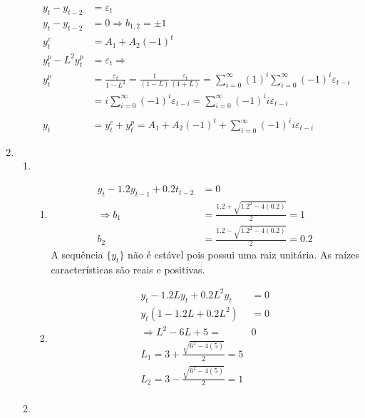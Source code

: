 \begin{enumerate}
\begin{enumerate}
		\begin{align*}
			y_t-y_{t-2}&=\varepsilon_t\\
			y_t-y_{t-2}&=0 \Rightarrow b_{1,2}=\pm1\\
			y_t^c&=A_1+A_2(-1)^t\\
			y_t^p-L^2y_t^p&=\varepsilon_t\Rightarrow\\ y_t^p&=\frac{\varepsilon_t}{1-L^2}=\frac{1}{(1-L)}\frac{\varepsilon_t}{(1+L)}=\sum \limits_{i=0}^{\infty}(1)^i\sum \limits_{i=0}^{\infty}(-1)^i\varepsilon_{t-i}\\
			&=i\sum \limits_{i=0}^{\infty}(-1)^i\varepsilon_{t-i}=\sum \limits_{i=0}^{\infty}(-1)^ii\varepsilon_{t-i}\\
			\\
			y_t&=y_t^c+y_t^p=A_1+A_2(-1)^t+\sum \limits_{i=0}^{\infty}(-1)^ii\varepsilon_{t-i}
		\end{align*}
	
	\end{enumerate}
	
	\item %
	
	\begin{enumerate}
		
		\item %
		\begin{enumerate}
			\item %
		
		\begin{align*}
			y_t-1.2y_{t-1}+0.2t_{t-2}&=0\\
			\Rightarrow b_1&=\frac{1.2+\sqrt{1.2^2-4(0.2)}}{2}=1\\
			b_2&=\frac{1.2-\sqrt{1.2^2-4(0.2)}}{2}=0.2
		\end{align*}		
		A sequência $\{y_t\}$ não é estável pois possui uma raiz unitária. As raízes características são reais e positivas.
		
		\item %
		
		\begin{align*}
			y_t-1.2Ly_t+0.2L^2y_t&=0\\
			y_t(1-1.2L+0.2L^2)&=0\\
			\Rightarrow L^2-6L+5=&0\\
			L_1=3+\frac{\sqrt{6^2-4(5)}}{2}=5\\
			L_2=3-\frac{\sqrt{6^2-4(5)}}{2}=1\\
			\end{align*}
			
	\end{enumerate}
		\item %
		

\end{enumerate}
\end{enumerate}
